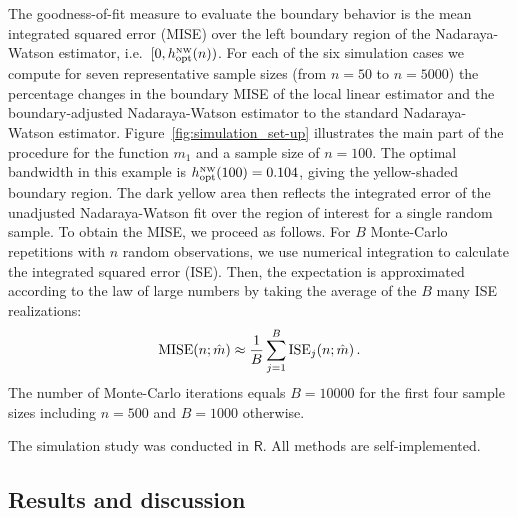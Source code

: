 The goodness-of-fit measure to evaluate the boundary behavior is the mean integrated squared error (MISE) over the left boundary region of the Nadaraya-Watson estimator,
i.e.\ $[0, h_{\text{opt}}^{\textup{\tiny NW}}(n))$.
For each of the six simulation cases we compute for seven representative sample sizes (from $n = 50$ to $n = 5000$) the percentage changes in the boundary MISE of the local linear estimator
and the boundary-adjusted Nadaraya-Watson estimator to the standard Nadaraya-Watson estimator.
Figure~\ref{fig:simulation_set-up} illustrates the main part of the procedure for the function $m_1$ and a sample size of $n = 100$.
The optimal bandwidth in this example is $h_{\text{opt}}^{\textup{\tiny NW}}(100) = 0.104$, giving the yellow-shaded boundary region.
The dark yellow area then reflects the integrated error of the unadjusted Nadaraya-Watson fit over the region of interest for a single random sample.
To obtain the MISE, we proceed as follows.
For $B$ Monte-Carlo repetitions with $n$ random observations,
we use numerical integration to calculate the integrated squared error (ISE).
Then, the expectation is approximated according to the law of large numbers by taking the average of the $B$ many ISE realizations:
\begin{equation}
	\operatorname{MISE}(n; \hat{m}) \approx \frac{1}{B} \sum_{j = 1}^{B} \operatorname{ISE}_j(n; \hat{m}) \,.
\end{equation}
The number of Monte-Carlo iterations equals $B = 10000$ for the first four sample sizes including $n = 500$ and $B = 1000$ otherwise.

The simulation study was conducted in $\mathsf{R}$. \nocite{R_2021}
All methods are self-implemented.

\subsection{Results and discussion}

